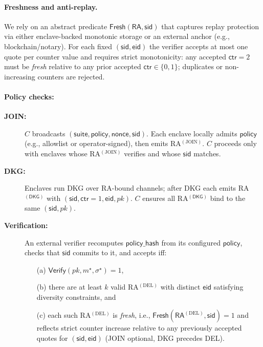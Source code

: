 \documentclass[runningheads,orivec]{llncs}
\begin{document}
\paragraph{Freshness and anti-replay.}
We rely on an abstract predicate $\textsf{Fresh}(\mathsf{RA},\mathsf{sid})$ that captures replay protection via either enclave-backed monotonic storage
or an external anchor (e.g., blockchain/notary). For each fixed $(\mathsf{sid},\mathsf{eid})$ the verifier accepts at most one quote per counter value and requires
strict monotonicity: any accepted $\mathsf{ctr}{=}2$ must be \emph{fresh} relative to any prior accepted $\mathsf{ctr}{\in}\{0,1\}$; duplicates or non-increasing counters are rejected.

\paragraph{Policy checks:}
\begin{description}
  \item[\textbf{JOIN:}] $C$ broadcasts $(\mathsf{suite},\mathsf{policy},\mathsf{nonce},\mathsf{sid})$.
  Each enclave locally admits $\mathsf{policy}$ (e.g., allowlist or operator-signed), then emits RA$^{(\mathrm{JOIN})}$.
  $C$ proceeds only with enclaves whose RA$^{(\mathrm{JOIN})}$ verifies and whose $\mathsf{sid}$ matches.
  \item[\textbf{DKG:}] Enclaves run DKG over RA-bound channels; after DKG each emits RA$^{(\mathsf{DKG})}$ with $(\mathsf{sid},\mathsf{ctr}{=}1,\mathsf{eid},pk)$.
  $C$ ensures all RA$^{(\mathsf{DKG})}$ bind to the same $(\mathsf{sid},pk)$.
  \item[\textbf{Verification:}] An external verifier recomputes $\mathsf{policy\_hash}$ from its configured $\mathsf{policy}$,
  checks that $\mathsf{sid}$ commits to it, and accepts iff:
  \begin{enumerate}
    \item[(a)] $\mathsf{Verify}(pk,m^{\star},\sigma^{\star})=1$,
    \item[(b)] there are at least $k$ valid RA$^{(\mathrm{DEL})}$ with distinct $\mathsf{eid}$ satisfying diversity constraints, and
    \item[(c)] each such RA$^{(\mathrm{DEL})}$ is \emph{fresh}, i.e., $\textsf{Fresh}(\mathsf{RA}^{(\mathrm{DEL})},\mathsf{sid}){=}1$ and reflects strict counter increase relative to any previously accepted quotes for $(\mathsf{sid},\mathsf{eid})$ (JOIN optional, DKG precedes DEL).
  \end{enumerate}
\end{description}
\end{document}
